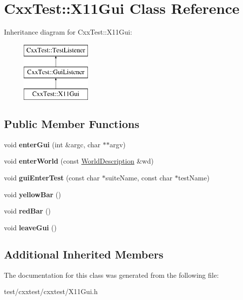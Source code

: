 \hypertarget{classCxxTest_1_1X11Gui}{\section{Cxx\-Test\-:\-:X11\-Gui Class Reference}
\label{classCxxTest_1_1X11Gui}
}
Inheritance diagram for Cxx\-Test\-:\-:X11\-Gui\-:\begin{figure}[H]
\begin{center}
\leavevmode
\includegraphics[height=3.000000cm]{classCxxTest_1_1X11Gui}
\end{center}
\end{figure}
\subsection*{Public Member Functions}
\begin{DoxyCompactItemize}
\item 
\hypertarget{classCxxTest_1_1X11Gui_ae2486eff18e9dde13abebf4e20686979}{void {\bfseries enter\-Gui} (int \&argc, char $\ast$$\ast$argv)}\label{classCxxTest_1_1X11Gui_ae2486eff18e9dde13abebf4e20686979}

\item 
\hypertarget{classCxxTest_1_1X11Gui_a130b274f2a763e99fee41b0ac397ab9d}{void {\bfseries enter\-World} (const \hyperlink{classCxxTest_1_1WorldDescription}{World\-Description} \&wd)}\label{classCxxTest_1_1X11Gui_a130b274f2a763e99fee41b0ac397ab9d}

\item 
\hypertarget{classCxxTest_1_1X11Gui_a4e382d67854003eb82ca75738ec8789f}{void {\bfseries gui\-Enter\-Test} (const char $\ast$suite\-Name, const char $\ast$test\-Name)}\label{classCxxTest_1_1X11Gui_a4e382d67854003eb82ca75738ec8789f}

\item 
\hypertarget{classCxxTest_1_1X11Gui_af9490e4a6a604a5fdd61cdac7fda5a54}{void {\bfseries yellow\-Bar} ()}\label{classCxxTest_1_1X11Gui_af9490e4a6a604a5fdd61cdac7fda5a54}

\item 
\hypertarget{classCxxTest_1_1X11Gui_a5897fd74481f9abba6cdbd2dfbd43145}{void {\bfseries red\-Bar} ()}\label{classCxxTest_1_1X11Gui_a5897fd74481f9abba6cdbd2dfbd43145}

\item 
\hypertarget{classCxxTest_1_1X11Gui_a046edf4f504ded2a365719bb65cfe8ab}{void {\bfseries leave\-Gui} ()}\label{classCxxTest_1_1X11Gui_a046edf4f504ded2a365719bb65cfe8ab}

\end{DoxyCompactItemize}
\subsection*{Additional Inherited Members}


The documentation for this class was generated from the following file\-:\begin{DoxyCompactItemize}
\item 
test/cxxtest/cxxtest/X11\-Gui.\-h\end{DoxyCompactItemize}
